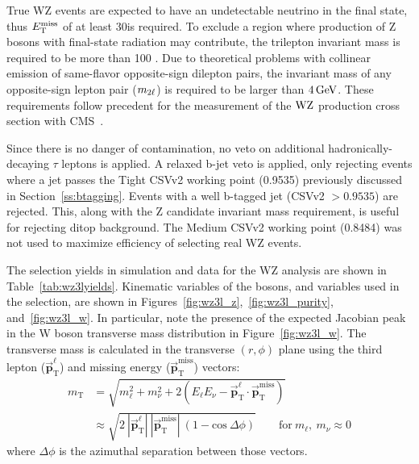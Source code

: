 True WZ events are expected to have an undetectable neutrino in the final state, thus $E_\mathrm{T}^{\mathrm{miss}}$ of at least 30\GeV is required.
To exclude a region where production of Z bosons with final-state radiation may contribute, the trilepton invariant mass is required to be more than 100 \GeV.
Due to theoretical problems with collinear emission of same-flavor opposite-sign dilepton pairs, the invariant mass of any opposite-sign lepton pair ($m_{2\ell}$) is required to be larger than $4\,\text{Ge\hspace{-.08em}V}$.
These requirements follow precedent for the measurement of the $\mathrm{W}\mathrm{Z}$ production cross section with CMS~\cite{Khachatryan:2016tgp}.

Since there is no danger of contamination, no veto on additional hadronically-decaying $\tau$ leptons is applied.
A relaxed b-jet veto is applied, only rejecting events where a jet passes the Tight CSVv2 working point (0.9535) previously discussed in Section~\ref{ss:btagging}.
Events with a well b-tagged jet (CSVv2 $>0.9535$) are rejected.
This, along with the Z candidate invariant mass requirement, is useful for rejecting ditop background.
The Medium CSVv2 working point (0.8484) was not used to maximize efficiency of selecting real WZ events.

The selection yields in simulation and data for the WZ analysis are shown in Table~\ref{tab:wz3lyields}.
Kinematic variables of the bosons, and variables used in the selection, are shown in Figures~\ref{fig:wz3l_z},~\ref{fig:wz3l_purity}, and~\ref{fig:wz3l_w}.
In particular, note the presence of the expected Jacobian peak in the W boson transverse mass distribution in Figure~\ref{fig:wz3l_w}.
The transverse mass is calculated in the transverse $(r,\phi)$ plane using the 
third lepton ($\vec{\mathbf{p}}_\mathrm{T}^\ell$) and missing energy ($\vec{\mathbf{p}}_\mathrm{T}^\mathrm{miss}$) vectors:
\begin{equation}
\label{eq:mt}
\begin{split}
m_\mathrm{T} & = \sqrt{m_\ell^2 + m_\nu^2 + 2(E_\ell E_\nu -\vec{\mathbf{p}}_\mathrm{T}^\ell \cdot \vec{\mathbf{p}}_\mathrm{T}^\mathrm{miss})} \\ 
& \approx \sqrt{2\:|\vec{\mathbf{p}}_\mathrm{T}^\ell|\:|\vec{\mathbf{p}}_\mathrm{T}^\mathrm{miss}|\:(1 - \mathrm{cos}\:\Delta\phi)} \qquad \mathrm{for}\:m_\ell,\:m_\nu\approx0
\end{split}
\end{equation}
where $\Delta\phi$ is the azimuthal separation between those vectors.

